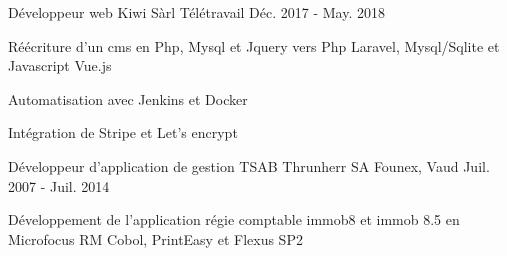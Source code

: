 

\begin{cventries}

  \cventry
    {Développeur web} %
    {Kiwi Sàrl} %
    {Télétravail} %
    {Déc. 2017 - May. 2018} %
    {
      \begin{cvitems} %
        \item {Réécriture d'un cms en Php, Mysql et Jquery vers Php Laravel, Mysql/Sqlite et Javascript Vue.js}
        \item {Automatisation avec Jenkins et Docker}
        \item {Intégration de Stripe et Let's encrypt}
      \end{cvitems}
    }

  \cventry
    {Développeur d'application de gestion} %
    {TSAB Thrunherr SA} %
    {Founex, Vaud} %
    {Juil. 2007 - Juil. 2014} %
    {
      \begin{cvitems} %
        \item {Développement de l'application régie comptable immob8 et immob 8.5 en Microfocus RM Cobol, PrintEasy et Flexus SP2}
      \end{cvitems}
    }

\end{cventries}
